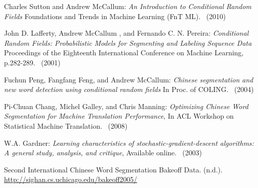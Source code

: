 \documentclass[UTF8,11pt]{article}
\begin{document}
\begin{thebibliography}{99}


 Charles Sutton and Andrew McCallum:
\emph{An Introduction to Conditional Random Fields}
Foundations and Trends in Machine Learning (FnT ML). ~(2010)

John D. Lafferty, Andrew McCallum , and Fernando C. N. Pereira:
\emph{Conditional Random Fields: Probabilistic Models for Segmenting and Labeling Sequence Data}
Proceedings of the Eighteenth International Conference on Machine Learning, p.282-289. ~(2001)

Fuchun Peng, Fangfang Feng, and Andrew McCallum:
\emph{Chinese segmentation and new word detection using conditional random fields}
In Proc. of COLING. ~(2004)

 Pi-Chuan Chang, Michel Galley, and Chris Manning:
\emph{Optimizing Chinese Word Segmentation for Machine Translation Performance},
In ACL Workshop on Statistical Machine Translation. ~(2008)

 W.A. Gardner:
\emph{Learning characteristics of stochastic-gradient-descent algorithms: A general study, analysis, and critique},
Available online. ~(2003)

 Second International Chinese Word Segmentation Bakeoff Data. (n.d.). \\
\url{http://sighan.cs.uchicago.edu/bakeoff2005/}


\end{thebibliography}
\end{document}
